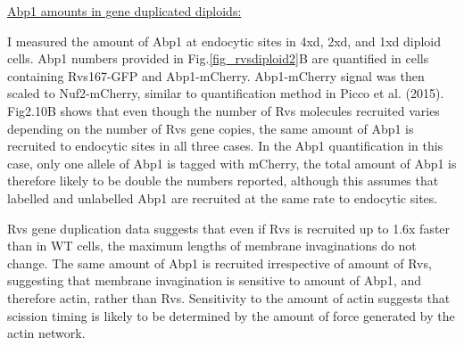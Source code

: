\underline{Abp1 amounts in gene duplicated diploids:}
		
I measured the amount of Abp1 at endocytic sites in 4xd, 2xd, and 1xd diploid cells. Abp1 numbers provided in Fig.\ref{fig_rvsdiploid2}B are quantified in cells containing Rvs167-GFP and Abp1-mCherry. Abp1-mCherry signal was then scaled to Nuf2-mCherry, similar to quantification method in Picco et al. (2015). Fig2.10B shows that even though the number of Rvs molecules recruited varies depending on the number of Rvs gene copies, the same amount of Abp1 is recruited to endocytic sites in all three cases. In the Abp1 quantification in this case, only one allele of Abp1 is tagged with mCherry, the total amount of Abp1 is therefore likely to be double the numbers reported, although this assumes that labelled and unlabelled Abp1 are recruited at the same rate to endocytic sites. 

Rvs gene duplication data suggests that even if Rvs is recruited up to 1.6x faster than in WT cells, the maximum lengths of membrane invaginations do not change. The same amount of Abp1 is recruited irrespective of amount of Rvs, suggesting that membrane invagination is sensitive to amount of Abp1, and therefore actin, rather than Rvs. Sensitivity to the amount of actin suggests that scission timing is likely to be determined by the amount of force generated by the actin network. 


